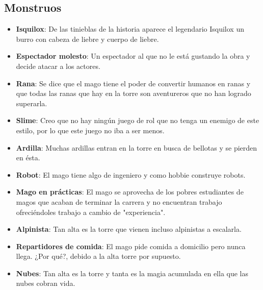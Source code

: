 \subsection{Monstruos}

\begin{itemize}
    \item \textbf{Isquilox}: De las tinieblas de la historia aparece el legendario Isquilox un burro con cabeza de liebre y cuerpo de liebre.
    \item \textbf{Espectador molesto}: Un espectador al que no le está gustando la obra y decide atacar a los actores.
    \item \textbf{Rana}: Se dice que el mago tiene el poder de convertir humanos en ranas y que todas las ranas que hay en la torre son aventureros que no han logrado superarla.
    \item \textbf{Slime}: Creo que no hay ningún juego de rol que no tenga un enemigo de este estilo, por lo que este juego no iba a ser menos.
    \item \textbf{Ardilla}: Muchas ardillas entran en la torre en busca de bellotas y se pierden en ésta.
    \item \textbf{Robot}: El mago tiene algo de ingeniero y como hobbie construye robots.
    \item \textbf{Mago en prácticas}: El mago se aprovecha de los pobres estudiantes de magos que acaban de terminar la carrera y no encuentran trabajo ofreciéndoles trabajo a cambio de "experiencia".
    \item \textbf{Alpinista}: Tan alta es la torre que vienen incluso alpinistas a escalarla.
    \item \textbf{Repartidores de comida}: El mago pide comida a domicilio pero nunca llega. ¿Por qué?, debido a la alta torre por supuesto.
    \item \textbf{Nubes}: Tan alta es la torre y tanta es la magia acumulada en ella que las nubes cobran vida.
\end{itemize}
